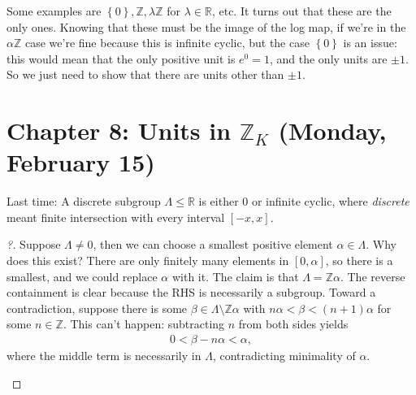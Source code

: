 \begin{answer}

Some examples are
\(\left\{{0}\right\}, {\mathbb{Z}}, \lambda {\mathbb{Z}}\) for
\(\lambda \in {\mathbb{R}}\), etc. It turns out that these are the only
ones. Knowing that these must be the image of the log map, if we're in
the \(\alpha{\mathbb{Z}}\) case we're fine because this is infinite
cyclic, but the case \(\left\{{ 0 }\right\}\) is an issue: this would
mean that the only positive unit is \(e^0 = 1\), and the only units are
\(\pm 1\). So we just need to show that there are units other than
\(\pm 1\).

\end{answer}

\hypertarget{chapter-8-units-in-mathbbz_k-monday-february-15}{%
\section{\texorpdfstring{Chapter 8: Units in \({\mathbb{Z}}_K\) (Monday,
February
15)}{Chapter 8: Units in \{\textbackslash mathbb\{Z\}\}\_K (Monday, February 15)}}\label{chapter-8-units-in-mathbbz_k-monday-february-15}}

Last time: A discrete subgroup \(\Lambda \leq {\mathbb{R}}\) is either
\(0\) or infinite cyclic, where \emph{discrete} meant finite
intersection with every interval \([-x, x]\).

\begin{proof}[?]

Suppose \(\Lambda \neq 0\), then we can choose a smallest positive
element \(\alpha\in \Lambda\). Why does this exist? There are only
finitely many elements in \([0, \alpha]\), so there is a smallest, and
we could replace \(\alpha\) with it. The claim is that
\(\Lambda = {\mathbb{Z}}\alpha\). The reverse containment is clear
because the RHS is necessarily a subgroup. Toward a contradiction,
suppose there is some \(\beta\in \Lambda\setminus{\mathbb{Z}}\alpha\)
with \(n \alpha < \beta < (n+1) \alpha\) for some \(n\in {\mathbb{Z}}\).
This can't happen: subtracting \(n\) from both sides yields
\begin{align*}
0 < \beta - n \alpha < \alpha
,\end{align*}
where the middle term is necessarily in \(\Lambda\), contradicting
minimality of \(\alpha\).

\begin{figure}
\centering
{}
\end{figure}

\end{proof}

